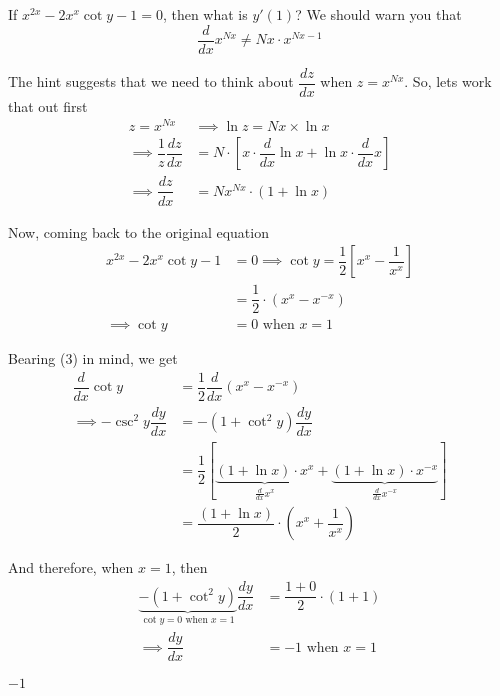
\question[3] If $x^{2x}-2x^{x}\cot y - 1 = 0$, then what is $y'(1)$? We should warn you that 
\[ \dfrac{d}{dx}x^{Nx}\neq Nx\cdot x^{Nx-1} \] 

\ifprintanswers
\fi 

\begin{solution}[\halfpage]
  The hint suggests that we need to think about $\dfrac{dz}{dx}$ when $z=x^{Nx}$. So, lets work that out first 
  \begin{align}
    z = x^{Nx} &\implies \ln z = Nx\times\ln x \\
    \implies \dfrac{1}{z}\dfrac{dz}{dx} &= N\cdot\left[ x\cdot\dfrac{d}{dx}\ln x + \ln x\cdot\dfrac{d}{dx}x\right] \\
    \implies \dfrac{dz}{dx} &= Nx^{Nx}\cdot(1+\ln x)
  \end{align}
  
  Now, coming back to the original equation
	\begin{align}
	  x^{2x}-2x^{x}\cot y - 1 &= 0 \implies
	  \cot y = \dfrac{1}{2}\left[x^{x}-\dfrac{1}{x^{x}} \right] \\
	  &= \dfrac{1}{2}\cdot(x^x-x^{-x}) \\
	  \implies\cot y &= 0 \text{ when } x = 1
	\end{align}
	
	Bearing (3) in mind, we get 
	\begin{align}
	  \dfrac{d}{dx}\cot y &= \dfrac{1}{2}\dfrac{d}{dx}(x^x-x^{-x}) \\
	  \implies -\csc^2 y\dfrac{dy}{dx} &= -(1+\cot^2 y)\dfrac{dy}{dx} \nonumber\\ 
	  &= \dfrac{1}{2}\left[ \underbrace{(1+\ln x)\cdot x^x}_{\frac{d}{dx}x^x} + 
	  \underbrace{(1+\ln x)\cdot x^{-x}}_{\frac{d}{dx}x^{-x}}\right] \\
	  &= \dfrac{(1+\ln x)}{2}\cdot\left(x^x + \dfrac{1}{x^x}\right)
	\end{align}
	
	And therefore, when $x=1$, then 
	\begin{align}
	  \underbrace{-(1+\cot^2 y)}_{\cot y = 0\text{ when } x=1}\dfrac{dy}{dx} &= 
	  \dfrac{1+0}{2}\cdot (1+1) \\
	  \implies \dfrac{dy}{dx} &= -1 \text{ when } x=1
	\end{align}	
\end{solution}
\ifprintanswers\begin{codex}$-1$\end{codex}\fi
